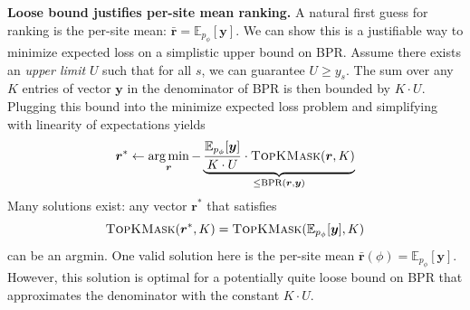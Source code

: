 
\textbf{Loose bound justifies per-site mean ranking.} A natural first guess for ranking is the per-site mean: $\bm{\bar{r}} = \mathbb{E}_{p_{\phi}}[\bm{y}]$. We can show this is a justifiable way to minimize expected loss on a simplistic upper bound on BPR.
Assume there exists an \emph{upper limit} $U$ such that for all $s$, we can guarantee $U \geq y_s$.
The sum over any $K$ entries of vector $\bm{y}$ in the denominator of BPR is then bounded by $K \cdot U$. Plugging this bound into the minimize expected loss problem and simplifying with linearity of expectations yields
\begin{align}
    \bm{r}^* \gets \operatorname*{arg\,min}_{\bm{r}} -
    \underbrace{
    \frac{
    \mathbb{E}_{p_{\phi}} [ \bm{y} ]
    }{
        K \cdot U
    } \cdot \textsc{TopKMask}( \bm{r}, K)
    }_{\leq \text{BPR}(\bm{r}, \bm{y})}
\end{align}
Many solutions exist: any vector $\bm{r}^*$
that satisfies
\[
    \textsc{TopKMask}(\bm{r}^*, K) = \textsc{TopKMask}(\mathbb{E}_{p_{\phi}}[\bm{y}], K)
\]
can be an argmin. One valid solution here is the per-site mean $\bm{\bar{r}}(\phi) = \mathbb{E}_{p_{\phi}}[\bm{y}]$. However, this solution is optimal for a potentially quite loose bound on BPR that approximates the denominator with the constant $K \cdot U$.


